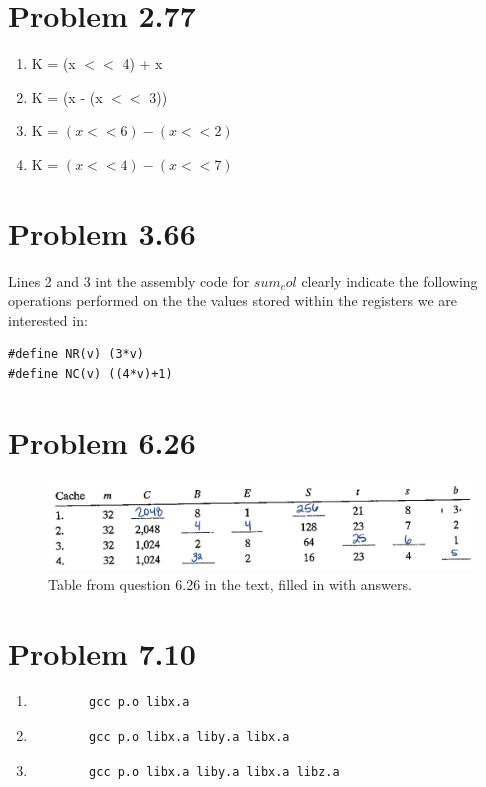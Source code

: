 \documentclass[12pt,letterpaper]{article}
\begin{document}
\section*{Problem 2.77}

\begin{enumerate}
\begin{enumerate}
    \item K = (x $<<$ 4) + x
    \item K = (x - (x $<<$ 3))
    \item K = $(x << 6) - (x << 2)$
    \item K = $(x << 4) - (x << 7)$
\end{enumerate}
\end{enumerate}
 
\section*{Problem 3.66}

Lines 2 and 3 int the assembly code for $sum_col$ clearly indicate the following operations performed on the the values stored within the registers we are interested in:
\begin{verbatim}
#define NR(v) (3*v)
#define NC(v) ((4*v)+1)    
\end{verbatim}

\section*{Problem 6.26}

\begin{figure}[!h]
    \centering
    \includegraphics[width=1\linewidth]{626.jpeg}
    \caption{Table from question 6.26 in the text, filled in with answers.}
\end{figure}

\section*{Problem 7.10}

\begin{enumerate}
\begin{enumerate}
    \item 
    \begin{verbatim}
        gcc p.o libx.a
    \end{verbatim}
    \item 
    \begin{verbatim}
        gcc p.o libx.a liby.a libx.a
    \end{verbatim}
    \item
    \begin{verbatim}
        gcc p.o libx.a liby.a libx.a libz.a
    \end{verbatim}
\end{enumerate}
\end{enumerate}
\end{document}
